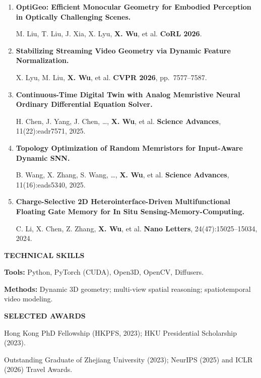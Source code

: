 \documentclass[a4paper]{article}
\newcommand{\cvsection}[1]{%
  \par\vspace{2.0pt}%
  {\color{cvblue}\fontsize{11}{12.2}\selectfont\bfseries\MakeUppercase{#1}}\par
  \vspace{-4pt}{\color{cvblue}\rule{\textwidth}{0.4pt}}\par\vspace{1.0pt}%
}
\begin{document}
{\begin{enumerate}[resume,leftmargin=1.6em,labelsep=0.38em,itemsep=0.4pt,topsep=1.3pt,parsep=0pt,partopsep=0pt]
M. Liu, X. Lyu, T. Ren, P. Dai, \textbf{X. Wu}, et al. \hfill \textbf{ECCV 2026}.
\item \textbf{OptiGeo: Efficient Monocular Geometry for Embodied Perception in Optically Challenging Scenes.}\par
M. Liu, T. Liu, J. Xia, X. Lyu, \textbf{X. Wu}, et al. \hfill \textbf{CoRL 2026}.
\item \textbf{Stabilizing Streaming Video Geometry via Dynamic Feature Normalization.}\par
X. Lyu, M. Liu, \textbf{X. Wu}, et al. \hfill \textbf{CVPR 2026}, pp.\ 7577--7587.
\item \textbf{Continuous-Time Digital Twin with Analog Memristive Neural Ordinary Differential Equation Solver.}\par
H. Chen, J. Yang, J. Chen, \ldots, \textbf{X. Wu}, et al. \hfill \textbf{Science Advances}, 11(22):eadr7571, 2025.
\item \textbf{Topology Optimization of Random Memristors for Input-Aware Dynamic SNN.}\par
B. Wang, X. Zhang, S. Wang, \ldots, \textbf{X. Wu}, et al. \hfill \textbf{Science Advances}, 11(16):eads5340, 2025.
\item \textbf{Charge-Selective 2D Heterointerface-Driven Multifunctional Floating Gate Memory for In Situ Sensing-Memory-Computing.}\par
C. Li, X. Chen, Z. Zhang, \textbf{X. Wu}, et al. \hfill \textbf{Nano Letters}, 24(47):15025--15034, 2024.
\end{enumerate}}

\cvsection{Technical Skills}
\textbf{Tools:} Python, PyTorch (CUDA), Open3D, OpenCV, Diffusers.\par
\textbf{Methods:} Dynamic 3D geometry; multi-view spatial reasoning; spatiotemporal video modeling.


\cvsection{Selected Awards}
Hong Kong PhD Fellowship (HKPFS, 2023); HKU Presidential Scholarship (2023).\par
Outstanding Graduate of Zhejiang University (2023); NeurIPS (2025) and ICLR (2026) Travel Awards.
\end{document}
